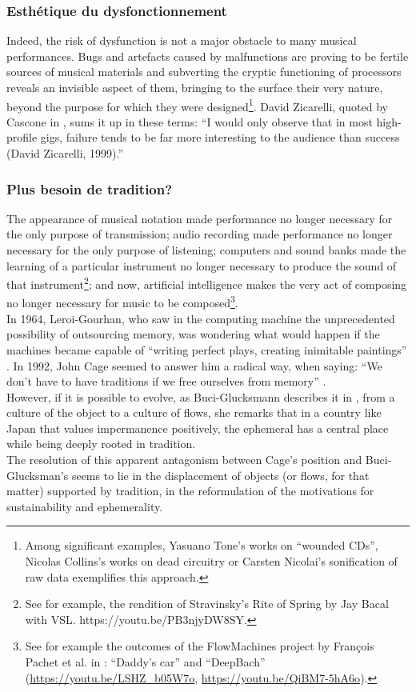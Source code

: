 \subsubsection{Esthétique du dysfonctionnement}
Indeed, the risk of dysfunction is not a major obstacle to many musical performances. Bugs and artefacts caused by malfunctions are proving to be fertile sources of musical materials and subverting the cryptic functioning of processors reveals an invisible aspect of them, bringing to the surface their very nature, beyond the purpose for which they were designed\footnote{Among significant examples, Yasuano Tone's works on “wounded CDs”, Nicolas Collins's works on dead circuitry or Carsten Nicolai's sonification of raw data exemplifies this approach.}. David Zicarelli, quoted by Cascone in \cite{cascone_aesthetics_2000}, sums it up in these terms: “I would only observe that in most high-profile gigs, failure tends to be far more interesting to the audience than success (David Zicarelli, 1999).”

\subsubsection{Plus besoin de tradition?}
The appearance of musical notation made performance no longer necessary for the only purpose of transmission; audio recording made performance no longer necessary for the only purpose of listening; computers and sound banks made the learning of a particular instrument no longer necessary to produce the sound of that instrument\footnote{See for example, the rendition of Stravinsky's Rite of Spring by Jay Bacal with VSL. https://youtu.be/PB3njyDW8SY.}; and now, artificial intelligence makes the very act of composing no longer necessary for music to be composed\footnote{See for example the outcomes of the FlowMachines project by François Pachet et al. in \cite{hadjeres_deepbach:_2016}: “Daddy's car” and “DeepBach” (\url{https://youtu.be/LSHZ_b05W7o}, \url{https://youtu.be/QiBM7-5hA6o}).}.\\
\indent In 1964, Leroi-Gourhan, who saw in the computing machine the unprecedented possibility of outsourcing memory, was wondering what would happen if the machines became capable of “writing perfect plays, creating inimitable paintings” \cite{leroi-gourhan_geste_1964}. In 1992, John Cage seemed to answer him a radical way, when saying: “We don't have to have traditions if we free ourselves from memory” \cite{sebestik_ecoute_1992}. \\
\indent However, if it is possible to evolve, as Buci-Glucksmann describes it in \cite{buci-glucksmann_esthetique_2003}, from a culture of the object to a culture of flows, she remarks that in a country like Japan that values impermanence positively, the ephemeral has a central place while being deeply rooted in tradition.	\\
\indent The resolution of this apparent antagonism between Cage's position and Buci-Glucksman's seems to lie in the displacement of objects (or flows, for that matter) supported by tradition, in the reformulation of the motivations for sustainability and ephemerality.



